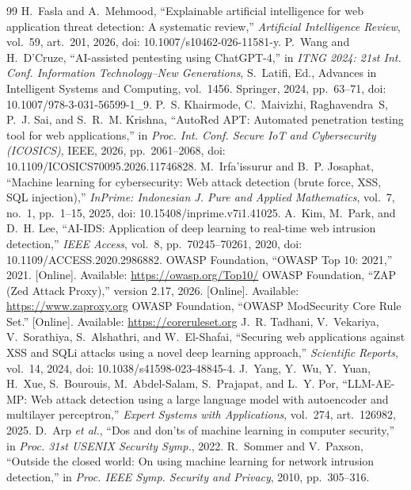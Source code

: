 \documentclass[conference]{IEEEtran}
\begin{document}
\begin{thebibliography}{99}
 H.~Fasla and A.~Mehmood, ``Explainable artificial intelligence for web application threat detection: A systematic review,'' \emph{Artificial Intelligence Review}, vol.~59, art.~201, 2026, doi: 10.1007/s10462-026-11581-y.
 P.~Wang and H.~D'Cruze, ``AI-assisted pentesting using ChatGPT-4,'' in \emph{ITNG 2024: 21st Int. Conf. Information Technology--New Generations}, S.~Latifi, Ed., Advances in Intelligent Systems and Computing, vol.~1456. Springer, 2024, pp.~63--71, doi: 10.1007/978-3-031-56599-1\_9.
 P.~S. Khairmode, C.~Maivizhi, Raghavendra~S, P.~J. Sai, and S.~R.~M. Krishna, ``AutoRed APT: Automated penetration testing tool for web applications,'' in \emph{Proc. Int. Conf. Secure IoT and Cybersecurity (ICOSICS)}, IEEE, 2026, pp.~2061--2068, doi: 10.1109/ICOSICS70095.2026.11746828.
 M.~Irfa'issurur and B.~P. Josaphat, ``Machine learning for cybersecurity: Web attack detection (brute force, XSS, SQL injection),'' \emph{InPrime: Indonesian J. Pure and Applied Mathematics}, vol.~7, no.~1, pp.~1--15, 2025, doi: 10.15408/inprime.v7i1.41025.
 A.~Kim, M.~Park, and D.~H. Lee, ``AI-IDS: Application of deep learning to real-time web intrusion detection,'' \emph{IEEE Access}, vol.~8, pp.~70245--70261, 2020, doi: 10.1109/ACCESS.2020.2986882.
 OWASP Foundation, ``OWASP Top 10: 2021,'' 2021. [Online]. Available: \url{https://owasp.org/Top10/}
 OWASP Foundation, ``ZAP (Zed Attack Proxy),'' version 2.17, 2026. [Online]. Available: \url{https://www.zaproxy.org}
 OWASP Foundation, ``OWASP ModSecurity Core Rule Set.'' [Online]. Available: \url{https://coreruleset.org}
 J.~R. Tadhani, V.~Vekariya, V.~Sorathiya, S.~Alshathri, and W.~El-Shafai, ``Securing web applications against XSS and SQLi attacks using a novel deep learning approach,'' \emph{Scientific Reports}, vol.~14, 2024, doi: 10.1038/s41598-023-48845-4.
 J.~Yang, Y.~Wu, Y.~Yuan, H.~Xue, S.~Bourouis, M.~Abdel-Salam, S.~Prajapat, and L.~Y. Por, ``LLM-AE-MP: Web attack detection using a large language model with autoencoder and multilayer perceptron,'' \emph{Expert Systems with Applications}, vol.~274, art.~126982, 2025.
 D.~Arp \emph{et al.}, ``Dos and don'ts of machine learning in computer security,'' in \emph{Proc. 31st USENIX Security Symp.}, 2022.
 R.~Sommer and V.~Paxson, ``Outside the closed world: On using machine learning for network intrusion detection,'' in \emph{Proc. IEEE Symp. Security and Privacy}, 2010, pp.~305--316.

\end{thebibliography}
\end{document}
